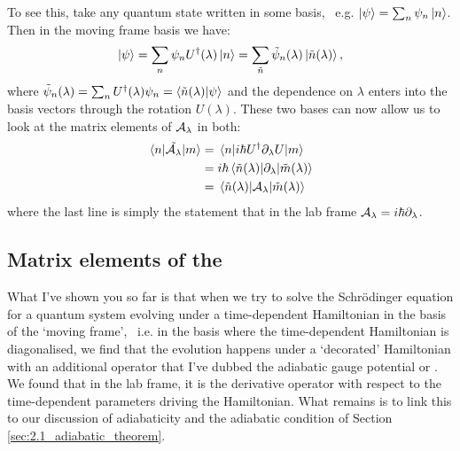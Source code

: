     To see this, take any quantum state written in some basis, \@~e.g. $\ket{\psi} = \sum_n \psi_n \ket{n}$. Then in the moving frame basis we have:
    \begin{equation}\label{eq:AGP_basis_change}
            \ket{\psi} = \sum_n \psi_n U^{\dagger}(\lambda) \ket{n} = \sum_{\Tilde{n}} \Tilde{\psi}_n (\lambda) \ket*{\Tilde{n}(\lambda)},
    \end{equation}
    where $\Tilde{\psi}_n (\lambda) = \sum_n U^{\dagger}(\lambda) \psi_n = \braket{\Tilde{n}(\lambda)}{\psi}$ and the dependence on $\lambda$ enters into the basis vectors through the rotation $U(\lambda)$. These two bases can now allow us to look at the matrix elements of $\mathcal{A}_{\lambda}$ in both:
    \begin{equation}\label{eq:AGP_as_derivative}
        \begin{aligned}
            \mel{n}{\Tilde{\mathcal{A}_{\lambda}}}{m} &= \mel{n}{i\hbar U^{\dagger}\partial_{\lambda}U}{m} \\
            &= i\hbar \mel{\Tilde{n}(\lambda)}{\partial_{\lambda}}{\Tilde{m}(\lambda)} \\
            &= \mel{\Tilde{n}(\lambda)}{\mathcal{A}_{\lambda}}{\Tilde{m}(\lambda)}
        \end{aligned}
    \end{equation}
    where the last line is simply the statement that in the lab frame $\mathcal{A}_{\lambda} = i\hbar \partial_{\lambda}$.

    \subsection{Matrix elements of the }

    What I've shown you so far is that when we try to solve the Schr\"{o}dinger equation for a quantum system evolving under a time-dependent Hamiltonian in the basis of the `moving frame', \@~i.e. in the basis where the time-dependent Hamiltonian is diagonalised, we find that the evolution happens under a `decorated' Hamiltonian with an additional operator that I've dubbed the adiabatic gauge potential or . We found that in the lab frame, it is the derivative operator with respect to the time-dependent parameters driving the Hamiltonian. What remains is to link this to our discussion of adiabaticity and the adiabatic condition of Section \ref{sec:2.1_adiabatic_theorem}.

